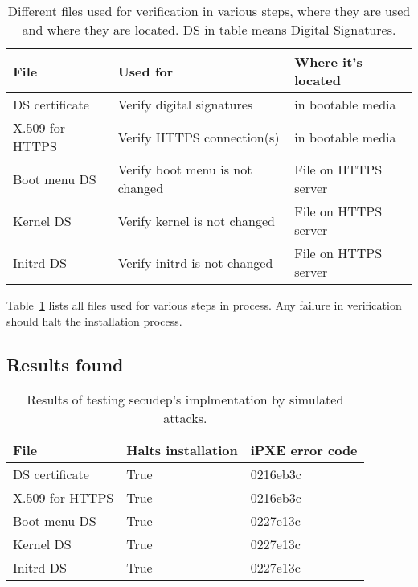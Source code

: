 \begin{table}[!ht]
  \def\arraystretch{1.1}%
  \begin{center}
    \begin{tabular}{| l | l | l |}
      \hline
      File            & Used for                        & Where it's located   \\
      \hline
      DS certificate  & Verify digital signatures       & in bootable media    \\
      X.509 for HTTPS & Verify HTTPS connection(s)      & in bootable media    \\
      Boot menu DS    & Verify boot menu is not changed & File on HTTPS server \\
      Kernel DS       & Verify kernel is not changed    & File on HTTPS server \\
      Initrd DS       & Verify initrd is not changed    & File on HTTPS server \\
      \hline
    \end{tabular}
    \caption{Different files used for verification in various steps,
      where they are used and where they are located. DS in table
      means Digital Signatures.\label{tab:verification_files}}
  \end{center}
\end{table}

Table~\ref{tab:verification_files} lists all files used for various
steps in process. Any failure in verification should halt the installation process.


\subsection{Results found}

\begin{table}[!ht]
  \def\arraystretch{1.1}%
  \begin{center}
    \begin{tabular}{| l | l | l |}
      \hline
      File            & Halts installation & iPXE error code \\
      \hline
      DS certificate  & True               & 0216eb3c        \\
      X.509 for HTTPS & True               & 0216eb3c        \\
      Boot menu DS    & True               & 0227e13c        \\
      Kernel DS       & True               & 0227e13c        \\
      Initrd DS       & True               & 0227e13c        \\
      \hline
    \end{tabular}
    \caption{Results of testing secudep's implmentation by simulated
      attacks.\label{tab:mechanical_check_results}}
  \end{center}
\end{table}

